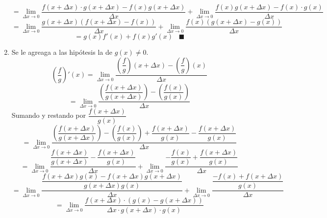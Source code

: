 \documentclass[10pt,twoside]{SelfArx} %
\begin{document}
\begin{enumerate}
\begin{equation}
=\lim\limits_{\Delta x\rightarrow 0}\dfrac{f(x+\Delta x)\cdot g(x+\Delta x)-f(x)g(x+\Delta x)}{\Delta x}
+
\lim\limits_{\Delta x\rightarrow 0}\dfrac{f(x)g(x+\Delta x)-f(x)\cdot g(x)}{\Delta x}
\end{equation}
\begin{equation}
=\lim\limits_{\Delta x\rightarrow 0}\dfrac{g(x+\Delta x)(f(x+\Delta x)-f(x))}{\Delta x}
+
\lim\limits_{\Delta x\rightarrow 0}\dfrac{f(x)(g(x+\Delta x)- g(x))}{\Delta x}
\end{equation}
\begin{equation}
=g(x)f'(x)+f(x)g'(x)	\;\;\; \blacksquare 
\end{equation}


	\item Se le agreaga a las hip\'otesis la de $ g(x)\neq0 $.
	\begin{equation}
	\left (\dfrac{f}{g}\right )'(x)=\lim\limits_{\Delta x\rightarrow 0}\dfrac{\left (\dfrac{f}{g}\right )(x+\Delta x)-\left (\dfrac{f}{g}\right )(x)}{\Delta x}
	\end{equation}
	\begin{equation}
	=\lim\limits_{\Delta x\rightarrow 0}\dfrac{\left (\dfrac{f(x+\Delta x)}{g(x+\Delta x)}\right )-\left (\dfrac{f(x)}{g(x)}\right )}{\Delta x}
	\end{equation}
	Sumando y restando por $ \dfrac{f(x+\Delta x)}{g(x)} $
	\begin{equation}
	=\lim\limits_{\Delta x\rightarrow 0}\dfrac{\left (\dfrac{f(x+\Delta x)}{g(x+\Delta x)}\right )-\left (\dfrac{f(x)}{g(x)}\right )+\dfrac{f(x+\Delta x)}{g(x)}-\dfrac{f(x+\Delta x)}{g(x)}}{\Delta x}
	\end{equation}
	\begin{equation}
		=\lim\limits_{\Delta x\rightarrow 0}\dfrac{\dfrac{f(x+\Delta x)}{g(x+\Delta x)}-\dfrac{f(x+\Delta x)}{g(x)}}{\Delta x}
+		\lim\limits_{\Delta x\rightarrow 0}\dfrac{-\dfrac{f(x)}{g(x)}+\dfrac{f(x+\Delta x)}{g(x)}}{\Delta x}
	\end{equation}
	\begin{equation}
			=\lim\limits_{\Delta x\rightarrow 0}\dfrac{\dfrac{f(x+\Delta x)g(x)-f(x+\Delta x)g(x+\Delta x)}{g(x+\Delta x)g(x)}}{\Delta x}
			+		\lim\limits_{\Delta x\rightarrow 0}\dfrac{\dfrac{-f(x)+f(x+\Delta x)}{g(x)}}{\Delta x}
	\end{equation}
	\begin{equation}
	=\lim\limits_{\Delta x\rightarrow 0}\dfrac{f(x+\Delta x)\cdot(g(x)-g(x+\Delta x))}{\Delta x\cdot g(x+\Delta x)\cdot g(x)}

\end{equation}
\end{enumerate}
\end{document}
